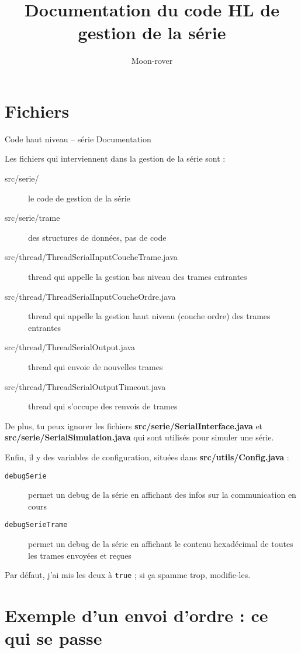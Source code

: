 \documentclass[a4paper, 12pt]{article}
\title{Documentation du code HL de gestion de la série}
\author{Moon-rover}
\date{}
\begin{document}
\maketitle

\pagestyle{plain}

\section{Fichiers}

Code haut niveau – série
Documentation

Les fichiers qui interviennent dans la gestion de la série sont :
\begin{description}
\item[src/serie/]
le code de gestion de la série
\item[src/serie/trame]
des structures de données, pas de code
\item[src/thread/ThreadSerialInputCoucheTrame.java]
thread qui appelle la gestion bas niveau des trames entrantes
\item[src/thread/ThreadSerialInputCoucheOrdre.java]
thread qui appelle la gestion haut niveau (couche ordre) des trames entrantes
\item[src/thread/ThreadSerialOutput.java]
thread qui envoie de nouvelles trames
\item[src/thread/ThreadSerialOutputTimeout.java]
thread qui s'occupe des renvois de trames
\end{description}

De plus, tu peux ignorer les fichiers \textbf{src/serie/SerialInterface.java} et \textbf{src/serie/SerialSimulation.java} qui sont utilisés pour simuler une série.

Enfin, il y des variables de configuration, situées dans \textbf{src/utils/Config.java} :
\begin{description}
\item[\texttt{debugSerie}] permet un debug de la série en affichant des infos sur la communication en cours
\item[\texttt{debugSerieTrame}] permet un debug de la série en affichant le contenu hexadécimal de toutes les trames envoyées et reçues
\end{description}

Par défaut, j'ai mis les deux à \texttt{true} ; si ça spamme trop, modifie-les.

\section{Exemple d'un envoi d'ordre : ce qui se passe}
\end{document}
